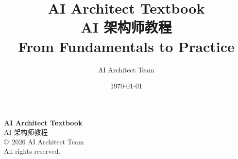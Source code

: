 \documentclass[12pt,a4paper,twoside]{book}
\title{
    \textbf{AI Architect Textbook}\\
    \vspace{1cm}
    \textbf{AI 架构师教程}\\
    \vspace{0.5cm}
    \large From Fundamentals to Practice
}
\author{
    AI Architect Team
}
\date{\today}
\theoremstyle{definition}
\theoremstyle{remark}
\begin{document}
\maketitle
\thispagestyle{empty}
\clearpage

\thispagestyle{empty}
\vspace*{\fill}
\begin{center}
    \textbf{AI Architect Textbook}\\
    AI 架构师教程\\
    \vspace{1cm}
    \copyright\ 2026 AI Architect Team\\
    All rights reserved.
\end{center}
\vspace*{\fill}
\clearpage

\tableofcontents
\clearpage



























\appendix


\printbibliography[heading=bibintoc,title={References}]
\end{document}

